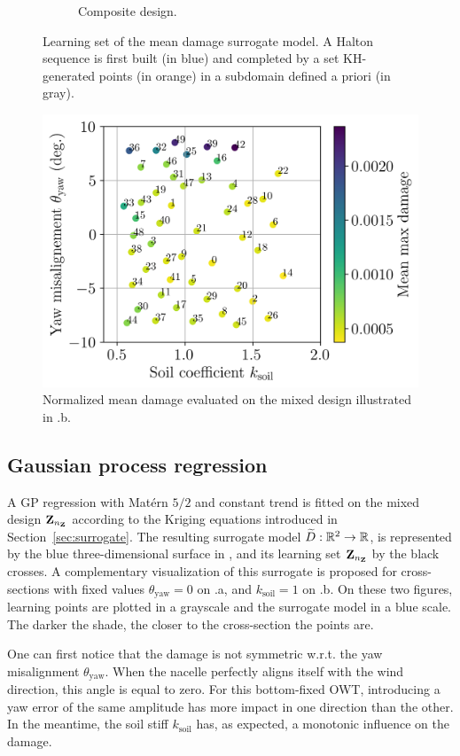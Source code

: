 \begin{figure}
\begin{subfigure}{0.48\linewidth}
        \caption{Composite design.}
    \end{subfigure}
    \caption{Learning set of the mean damage surrogate model. A Halton sequence is first built (in blue) and completed by a set KH-generated points (in orange) in a subdomain defined a priori (in gray).}
    \label{fig:initial_doe}
\end{figure}

\begin{figure}[h!]
    \centering
    \includegraphics[width=0.6\linewidth]{./part3/figures/OWT/normalized_results_mean.png}
    \caption{Normalized mean damage evaluated on the mixed design illustrated in .b.}
    \label{fig:evaluated_doe}
\end{figure}


\subsection{Gaussian process regression}\label{sec:gp_owt}
A GP regression with Matérn $5/2$ and constant trend is fitted on the mixed design ${\bf Z}_{n_{\bf Z}}$ according to the Kriging equations introduced in Section~\ref{sec:surrogate}. 
The resulting surrogate model $\widetilde{D}:\mathbb{R}^2 \rightarrow \mathbb{R}$, is represented by the blue three-dimensional surface in , and its learning set  ${\bf Z}_{n_{\bf Z}}$ by the black crosses.  
A complementary visualization of this surrogate is proposed for cross-sections with fixed values $\theta_{\mathrm{yaw}}=0$ on .a, and $k_{\mathrm{soil}}=1$ on .b. 
On these two figures, learning points are plotted in a grayscale and the surrogate model in a blue scale. 
The darker the shade, the closer to the cross-section the points are. 

One can first notice that the damage is not symmetric w.r.t. the yaw misalignment $\theta_{\mathrm{yaw}}$. 
When the nacelle perfectly aligns itself with the wind direction, this angle is equal to zero. 
For this bottom-fixed OWT, introducing a yaw error of the same amplitude has more impact in one direction than the other. 
In the meantime, the soil stiff $k_{\mathrm{soil}}$ has, as expected, a monotonic influence on the damage. 

